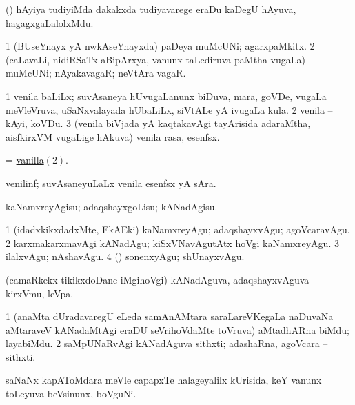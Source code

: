 \bentry
{} 
\gl{\nA}
\expl{}
\bmng
 (\nw) hAyiya tudiyiMda dakakxda tudiyavarege eraDu kaDegU hAyuva, hagagxgaLalolxMdu. 
\emng
\eentry

\bentry
{} 
\gl{\nA}
\expl{}
\bmng
\bnum
\num{1} (BUseYnayx yA nwkAseYnayxda) paDeya muMcUNi; agarxpaMkitx. 
\num{2} (caLavaLi, nidiRSaTx aBipArxya, \mo vanunx taLediruva paMtha \mo vugaLa) muMcUNi; nAyakavagaR; neVtAra vagaR. 
\enum
\emng
\eentry

\bentry
{} 
\gl{\nA}
\expl{}
\bmng
\bnum
\num{1} venila baLiLx; suvAsaneya hUvugaLanunx biDuva, mara, goVDe, \mo vugaLa meVleVruva, uSaNxvalayada hUbaLiLx, siVtALe yA ivugaLa kula. 
\hypertarget{vanilla(2)}{} 
\num{2} venila -- kAyi, koVDu. 
\num{3} (venila biVjada yA kaqtakavAgi tayArisida adaraMtha, aisfkirxVM \mo vugaLige hAkuva) venila rasa, esenfsx. 
\enum
\emng
\eentry

\bentry
{} 
\gl{\nA}
\expl{}
\bmng
 = \hyperlink{vanilla(2)}{vanilla\((2)\)}. 
\emng
\eentry

\bentry
{} 
\gl{\nA}
\expl{}
\bmng
 venilinf; suvAsaneyuLaLx venila esenfsx yA sAra. 
\emng
\eentry

\bentry
{} 
\gl{\sakirx}
\expl{}
\bmng
 kaNamxreyAgisu; adaqshayxgoLisu; kANadAgisu. 
\emng

\noindent
\gl{\akirx}
\expl{}
\bmng
\bnum
\num{1} (idadxkikxdadxMte, EkAEki) kaNamxreyAgu; adaqshayxvAgu; agoVcaravAgu. 
\num{2} karxmakarxmavAgi kANadAgu; kiSxVNavAgutAtx hoVgi kaNamxreyAgu. 
\num{3} ilalxvAgu; nAshavAgu. 
\num{4} (\ga) sonenxyAgu; shUnayxvAgu. 
\enum
\emng
\eentry

\bentry
{}
\gl{\nA}
\expl{}
\bmng
 (camaRkekx tikikxdoDane iMgihoVgi) kANadAguva, adaqshayxvAguva -- kirxVmu, leVpa. 
\emng
\eentry

\bentry
{} 
\gl{\nA}
\expl{}
\bmng
\bnum
\num{1} (anaMta dUradavaregU eLeda samAnAMtara saraLareVKegaLa naDuvaNa aMtaraveV kANadaMtAgi eraDU seVrihoVdaMte toVruva) aMtadhARna biMdu; layabiMdu. 
\num{2} saMpUNaRvAgi kANadAguva sithxti; adashaRna, agoVcara -- sithxti. 
\enum
\emng
\eentry

\bentry
{} 
\gl{\nA}
\bmng
 saNaNx kapAToMdara meVle capapxTe halageyalilx kUrisida, keY \mo vanunx toLeyuva beVsinunx, boVguNi. 
\emng
\eentry

